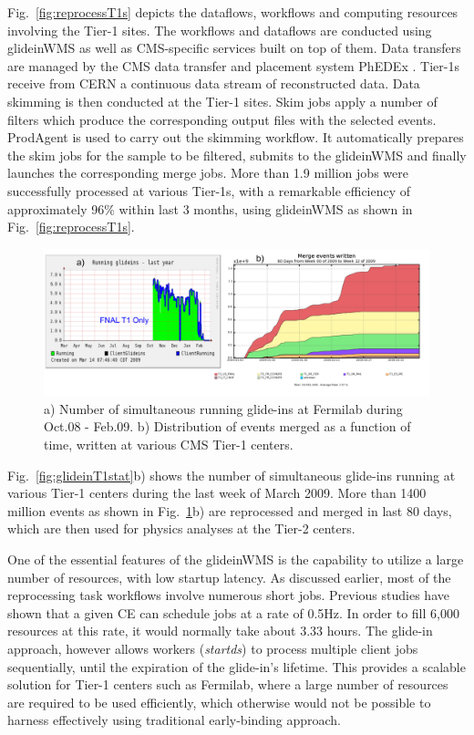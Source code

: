 \documentclass[a4paper]{jpconf}
\begin{document}
Fig.~\ref{fig:reprocessT1s} depicts the dataflows, workflows and computing resources involving the Tier-1 sites.
The workflows and dataflows are conducted using glideinWMS  as well as CMS-specific services 
built on top of them. Data transfers are managed by the CMS data transfer and placement 
system PhEDEx \cite{bib:cms_phedex}. Tier-1s receive from CERN a continuous data stream of reconstructed data. Data skimming 
is then conducted at the Tier-1 sites. Skim jobs apply a number of filters which produce the 
corresponding output files with the selected events. ProdAgent is used to carry out the skimming workflow. 
It automatically prepares the skim jobs for the sample to be filtered, submits to the glideinWMS and finally
launches the corresponding merge jobs. More than 1.9 million jobs were successfully processed at various 
Tier-1s, with a remarkable efficiency of approximately 96\% within last 3 months, using glideinWMS as shown 
in Fig.~\ref{fig:reprocessT1s}.
\begin{figure}
\begin{center}
\includegraphics[scale=0.55]{merged_events}
\end{center}
\caption{a) Number of simultaneous running glide-ins at Fermilab during Oct.08 - Feb.09. b) Distribution of 
events merged as a function of time, written at various CMS Tier-1 centers.}
\label{fig:merged_events}
\end{figure}
Fig.~\ref{fig:glideinT1stat}b) shows the number of simultaneous glide-ins running at various Tier-1 centers during the last week of March 2009. 
More than 1400 million events as shown in Fig.~\ref{fig:merged_events}b) are reprocessed and merged in last 80 days, which are then 
used for physics analyses at the Tier-2 centers. 

One of the essential features of the glideinWMS is the capability to utilize a large number of
resources, with low startup latency. As discussed earlier, most of the reprocessing task 
workflows involve numerous short jobs. Previous studies have shown that a given CE can 
schedule jobs at a rate of 0.5Hz. In order to fill 6,000 resources at this rate, it would normally take 
about 3.33 hours.  The glide-in approach, however allows workers (\emph{startds}) 
to process multiple client jobs sequentially, until 
the expiration of the glide-in's lifetime. This provides a scalable solution for Tier-1 centers such as Fermilab, 
where a large number of resources are required to be used efficiently, which otherwise would not 
be possible to harness effectively using traditional early-binding approach.
\end{document}
